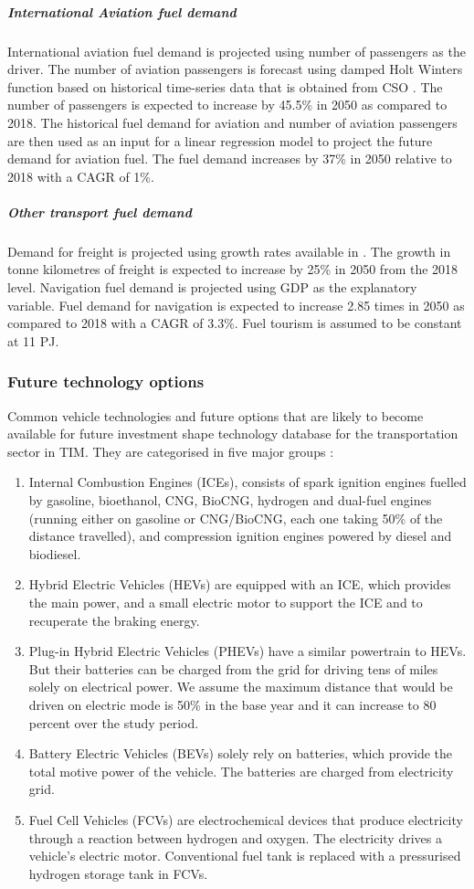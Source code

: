 \documentclass[journal abbreviation, manuscript]{copernicus}
\begin{document}
\subparagraph{International Aviation fuel demand}
International aviation fuel demand is projected using number of passengers as the driver. The number of aviation passengers is forecast using damped Holt Winters function based on historical time-series data that is obtained from CSO \cite{Dantas2017,Grubb2001}. The number of passengers is expected to increase by 45.5\% in 2050 as compared to 2018. The historical fuel demand for aviation and number of aviation passengers are then used as an input for a linear regression model to project the future demand for aviation fuel. The fuel demand increases by 37\% in 2050 relative to 2018 with a CAGR of 1\%. 

\subparagraph{Other transport fuel demand}
Demand for freight is projected using growth rates available in \cite{yan2020freight}. The growth in tonne kilometres of freight is expected to increase by 25\% in 2050 from the 2018 level. Navigation fuel demand is projected using GDP as the explanatory variable. Fuel demand for navigation is expected to increase 2.85 times in 2050 as compared to 2018 with a CAGR of 3.3\%. Fuel tourism is assumed to be constant at 11 PJ. 

\subsubsection{Future technology options}

Common vehicle technologies and future options that are likely to become available for future investment shape technology database for the transportation sector in TIM. They are categorised in five major groups \cite{Aryanpur2015}:
\begin{enumerate}
 \item Internal Combustion Engines (ICEs), consists of spark ignition engines fuelled by gasoline, bioethanol, CNG, BioCNG, hydrogen and dual-fuel engines (running either on gasoline or CNG/BioCNG, each one taking 50\% of the distance travelled), and compression ignition engines powered by diesel and biodiesel. 
\item Hybrid Electric Vehicles (HEVs) are equipped with an ICE, which provides the main power, and a small electric motor to support the ICE and to recuperate the braking energy. 
\item Plug-in Hybrid Electric Vehicles (PHEVs) have a similar powertrain to HEVs. But their batteries can be charged from the grid for driving tens of miles solely on electrical power. We assume the maximum distance that would be driven on electric mode is 50\% in the base year and it can increase to 80 percent over the study period. 
\item Battery Electric Vehicles (BEVs) solely rely on batteries, which provide the total motive power of the vehicle. The batteries are charged from electricity grid. 
\item Fuel Cell Vehicles (FCVs) are electrochemical devices that produce electricity through a reaction between hydrogen and oxygen. The electricity drives a vehicle’s electric motor. Conventional fuel tank is replaced with a pressurised hydrogen storage tank in FCVs. 
\end{enumerate}
\end{document}

